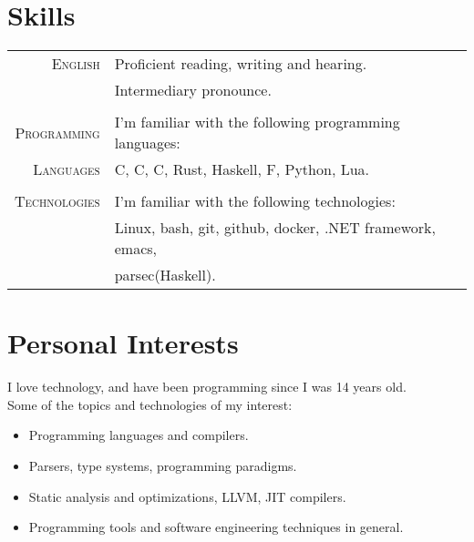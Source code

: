 \documentclass[a4paper,10pt]{article}
\newcommand{\cpp}{C\protect\scalebox{0.8}{\protect\raisebox{0.4ex}{++}}}
\renewcommand\#{\protect\scalebox{0.8}{\protect\raisebox{0.4ex}{\char"0023}}}
\begin{document}
\section{Skills}
\begin{tabular}{r|l}
  \textsc{English} & Proficient reading, writing and hearing. \\
  & Intermediary pronounce. \\
  
  \multicolumn{2}{c}{} \\
  \textsc{Programming} & I'm familiar with the following programming languages: \\
  \textsc{Languages} & C, \cpp, C\#, Rust, Haskell, F\#, Python, Lua. \\
  
  \multicolumn{2}{c}{} \\
  \textsc{Technologies} & I'm familiar with the following technologies: \\
  & Linux, bash, git, github, docker, .NET framework, emacs, \\
  & parsec(Haskell).
\end{tabular}


\section{Personal Interests}
I love technology, and have been programming since I was 14 years old. \\
Some of the topics and technologies of my interest:
\vspace{-3pt}
\begin{itemize}
  \setlength\itemsep{-3pt}
  \item Programming languages and compilers.
  \item Parsers, type systems, programming paradigms.
  \item Static analysis and optimizations, LLVM, JIT compilers.
  \item Programming tools and software engineering techniques in general.
\end{itemize}
\end{document}
